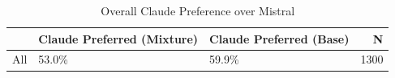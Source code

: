 \begin{table}[h]
\caption{Overall Claude Preference over Mistral}
\label{tab:overall_preference}
\begin{tabular}{lllr}
\toprule
 & Claude Preferred (Mixture) & Claude Preferred (Base) & N \\
\midrule
All & 53.0\% & 59.9\% & 1300 \\
\bottomrule
\end{tabular}
\end{table}
